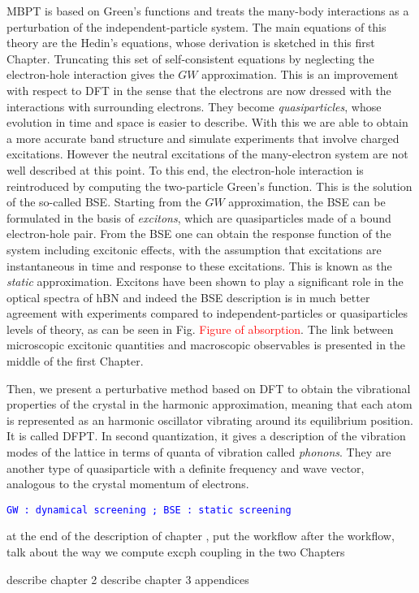 \acrshort{MBPT} is based on Green's functions and treats the many-body interactions as a perturbation of the independent-particle system. The main equations of this theory are the Hedin's equations, whose derivation is sketched in this first Chapter. Truncating this set of self-consistent equations by neglecting the electron-hole interaction gives the $GW$ approximation. This is an improvement with respect to \acrshort{DFT} in the sense that the electrons are now dressed with the interactions with surrounding electrons. They become \textit{quasiparticles}, whose evolution in time and space is easier to describe. With this we are able to obtain a more accurate band structure and simulate experiments that involve charged excitations. However the neutral excitations of the many-electron system are not well described at this point. To this end, the electron-hole interaction is reintroduced by computing the two-particle Green's function. This is the solution of the so-called \acrfull{BSE}. Starting from the $GW$ approximation, the \acrshort{BSE} can be formulated in the basis of \textit{excitons}, which are quasiparticles made of a bound electron-hole pair. From the \acrshort{BSE} one can obtain the response function of the system including excitonic effects, with the assumption that excitations are instantaneous in time and response to these excitations. This is known as the \textit{static} approximation. Excitons have been shown to play a significant role in the optical spectra of \acrshort{hBN} and indeed the \acrshort{BSE} description is in much better agreement with experiments compared to independent-particles or quasiparticles levels of theory, as can be seen in Fig. \textcolor{red}{Figure of absorption}. The link between microscopic excitonic quantities and macroscopic observables is presented in the middle of the first Chapter. 

Then, we present a perturbative method based on \acrshort{DFT} to obtain the vibrational properties of the crystal in the harmonic approximation, meaning that each atom is represented as an harmonic oscillator vibrating around its equilibrium position. It is called \acrfull{DFPT}. In second quantization, it gives a description of the vibration modes of the lattice in terms of quanta of vibration called \textit{phonons}. They are another type of quasiparticle with a definite frequency and wave vector, analogous to the crystal momentum of electrons. 


\textcolor{blue}{\texttt{GW : dynamical screening ; BSE : static screening}}

at the end of the description of chapter , put the workflow
after the workflow, talk about the way we compute excph coupling in the two Chapters

describe chapter 2
describe chapter 3
appendices

